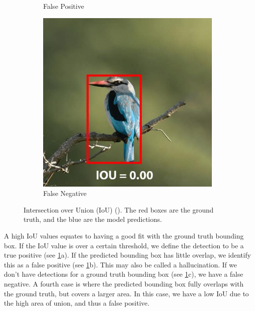 \begin{figure}[H]
\begin{subfigure}{0.32\textwidth}
        \caption{\centering False Positive}
    \end{subfigure}
    \hfill
    \begin{subfigure}{0.32\textwidth}
        \centering
        \includegraphics[width=\textwidth]{Images/iou_right.png}
        \caption{\centering False Negative}
    \end{subfigure}
    \centering
    \caption[Intersection over Union (IoU) (\cite{learnopencv_iou})]{\centering Intersection over Union (IoU) (\cite{learnopencv_iou}). The red boxes are the ground truth, and the blue are the model predictions.}
    \label{fig:IoU}
\end{figure}

A high IoU values equates to having a good fit with the ground truth bounding box. If the IoU value is over a certain threshold, we define the detection to be a true positive (see \ref{fig:IoU}a). If the predicted bounding box has little overlap, we identify this as a false positive (see \ref{fig:IoU}b). This may also be called a hallucination. If we don't have detections for a ground truth bounding box (see \ref{fig:IoU}c), we have a false negative. A fourth case is where the predicted bounding box fully overlaps with the ground truth, but covers a larger area. In this case, we have a low IoU due to the high area of union, and thus a false positive. 

